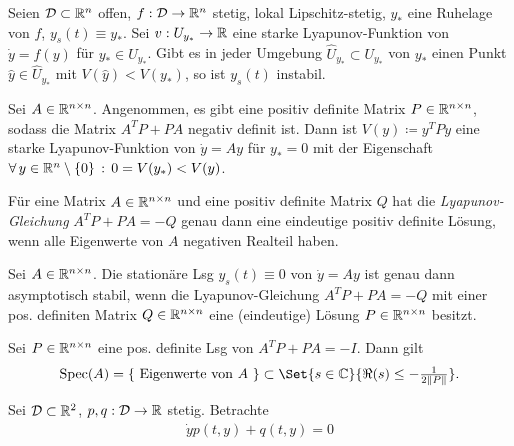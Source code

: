 \documentclass{cheat-sheet}
\newcommand{\D}{\mathcal{D}}
\DeclareMathOperator{\Spec}{Spec} %
\begin{document}
\begin{satz}
  Seien $\D \subset \R^n$ offen, $f : \D \to \R^n$ stetig, lokal Lipschitz-stetig, $y_{*}$ eine Ruhelage von $f$, $y_s(t) \equiv y_{*}$. Sei $v : U_{y_{*}} \to \mathbb{R}$ eine starke Lyapunov-Funktion von $\dot{y} = f(y)$ für $y_{*} \in U_{y_{*}}$. Gibt es in jeder Umgebung $\widehat{U}_{y_{*}} \subset U_{y_{*}}$ von $y_{*}$ einen Punkt $\hat{y} \in \widehat{U}_{y_*}$ mit $V(\hat{y}) < V(y_*)$, so ist $y_s(t)$ instabil.
\end{satz}


\begin{satz}
  Sei $A \in \mathbb{R}^{n \times n}$. Angenommen, es gibt eine positiv definite Matrix $P \in \mathbb{R}^{n \times n}$, sodass die Matrix $A^T P + PA$ negativ definit ist. Dann ist $V(y) \coloneqq y^T P y$ eine starke Lyapunov-Funktion von $\dot{y} = Ay$ für $y_{*} = 0$ mit der Eigenschaft $\forall \, {y \in \mathbb{R}^n \setminus \{ 0 \}} \,:\, 0 = V(y_*) < V(y)$.
\end{satz}

\begin{satz}
  Für eine Matrix $A \in \mathbb{R}^{n \times n}$ und eine positiv definite Matrix $Q$ hat die \emph{Lyapunov-Gleichung} $A^T P + PA = -Q$ genau dann eine eindeutige positiv definite Lösung, wenn alle Eigenwerte von $A$ negativen Realteil haben.
\end{satz}

\begin{kor}
  Sei $A \in \mathbb{R}^{n \times n}$. Die stationäre Lsg $y_s(t) \equiv 0$ von $\dot{y} = Ay$ ist genau dann asymptotisch stabil, wenn die Lyapunov-Gleichung $A^T P + PA = - Q$ mit einer pos. definiten Matrix $Q \in \mathbb{R}^{n \times n}$ eine (eindeutige) Lösung $P \in \mathbb{R}^{n \times n}$ besitzt.
\end{kor}

\begin{satz}
  Sei $P \in \mathbb{R}^{n \times n}$ eine pos. definite Lsg von $A^T P + PA = -I$. Dann gilt
  \[ \Spec(A) = \{ \text{ Eigenwerte von $A$ } \} \subset \Set{s \in \C}{\Re(s) \leq - \tfrac{1}{2 \norm{P}}}. \]
\end{satz}


\begin{prob}
  Sei $\D \subset \R^2$, $p, q : \D \to \R$ stetig. Betrachte
  \begin{align*}
    \dot{y} p(t, y) + q(t, y) = 0 \tag{5.1}
  \end{align*}
\end{prob}
\end{document}
